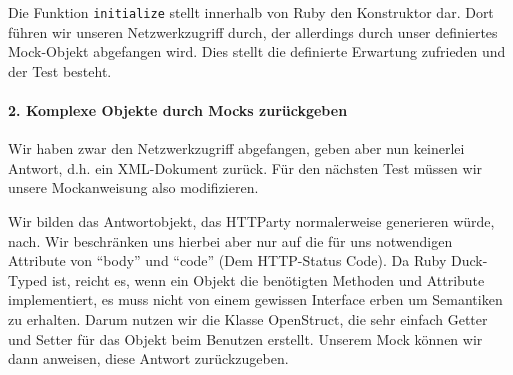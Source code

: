 \tddgreen
Die Funktion \texttt{initialize} stellt innerhalb von Ruby den Konstruktor dar. Dort führen wir unseren Netzwerkzugriff durch, der allerdings durch unser definiertes Mock-Objekt abgefangen wird. Dies stellt die definierte Erwartung zufrieden und der Test besteht.



\paragraph{2. Komplexe Objekte durch Mocks zurückgeben}

Wir haben zwar den Netzwerkzugriff abgefangen, geben aber nun keinerlei Antwort, d.h. ein XML-Dokument zurück. Für den nächsten Test müssen wir unsere Mockanweisung also modifizieren.

\begin{ruby}[label=test/test\_imported\_feed.rb]
  
      
        
      


      
      
\end{ruby}

Wir bilden das Antwortobjekt, das HTTParty normalerweise generieren würde, nach. Wir beschränken uns hierbei aber nur auf die für uns notwendigen Attribute von "`body"' und "`code"' (Dem HTTP-Status Code). Da Ruby Duck-Typed ist, reicht es, wenn ein Objekt die benötigten Methoden und Attribute implementiert, es muss nicht von einem gewissen Interface erben um Semantiken zu erhalten. Darum nutzen wir die Klasse OpenStruct, die sehr einfach Getter und Setter für das Objekt beim Benutzen erstellt. Unserem Mock können wir dann anweisen, diese Antwort zurückzugeben.
\tddred

